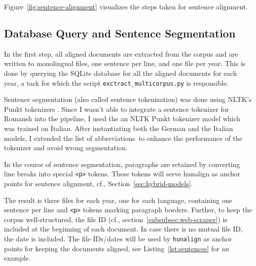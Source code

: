 Figure~\ref{fig:sentence-alignment} visualizes the steps taken for sentence alignment.

\subsection{Database Query and Sentence Segmentation}
In the first step, all aligned documents are extracted from the corpus and are written to monolingual files, one sentence per line, and one file per year.
This is done by querying the SQLite database for all the aligned documents for each year, a task for which the script \texttt{exctract\_multicorpus.py} is responsible.

Sentence segmentation (also called sentence tokenization) was done using NLTK's Punkt tokenizers \autocite{bird-2009-nltk}. 
Since I wasn't able to integrate a sentence tokenizer for Romansh into the pipeline, I used the an NLTK Punkt tokenizer model which was trained on Italian. 
After instantiating both the German and the Italian models, I extended the list of abbreviations\footnotemark~to enhance the performance of the tokenizer and avoid wrong segmentation. 


In the course of sentence segmentation, paragraphs are retained by converting line breaks into  special \texttt{<p>} tokens. 
These tokens will serve hunalign as anchor points for sentence alignment, cf.,  Section~\ref{sec:hybrid-models}.

The result is three files for each year, one for each language, containing one sentence per line and \texttt{<p>} tokens marking paragraph borders. 
Further, to keep the corpus well-structured, the file ID (cf., section~\ref{subsubsec:web-scraper}) is included at the beginning of each document. 
In case there is no mutual file ID, the date is included. 
The file IDs/dates will be used by \texttt{hunalign} as anchor points for keeping the documents aligned, see Listing~\ref{lst:sentences} for an example.

\vspace{0.25cm}

